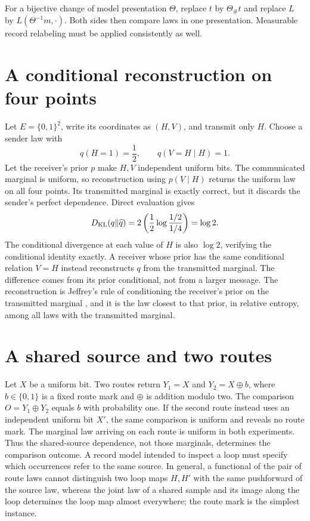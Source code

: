 For a bijective change of model presentation $\Theta$, replace $t$ by $\Theta_\#t$ and replace $L$ by $L(\Theta^{-1}m,\cdot)$. Both sides then compare laws in one presentation. Measurable record relabeling must be applied consistently as well.

\section{A conditional reconstruction on four points}

Let $E=\{0,1\}^2$, write its coordinates as $(H,V)$, and transmit only $H$. Choose a sender law with
\begin{equation}
q(H=1)=\frac12,
\qquad q(V=H\mid H)=1.
\end{equation}
Let the receiver's prior $p$ make $H,V$ independent uniform bits. The communicated marginal is uniform, so reconstruction using $p(V\mid H)$ returns the uniform law on all four points. Its transmitted marginal is exactly correct, but it discards the sender's perfect dependence. Direct evaluation gives
\begin{equation}
D_{\mathrm{KL}}(q\Vert\widehat q)
=2\left(\frac12\log\frac{1/2}{1/4}\right)=\log 2.
\end{equation}
The conditional divergence at each value of $H$ is also $\log2$, verifying the conditional identity exactly. A receiver whose prior has the same conditional relation $V=H$ instead reconstructs $q$ from the transmitted marginal. The difference comes from its prior conditional, not from a larger message. The reconstruction is Jeffrey's rule of conditioning the receiver's prior on the transmitted marginal \citep{DiaconisZabell1982}, and it is the law closest to that prior, in relative entropy, among all laws with the transmitted marginal.

\section{A shared source and two routes}

Let $X$ be a uniform bit. Two routes return $Y_1=X$ and $Y_2=X\oplus b$, where $b\in\{0,1\}$ is a fixed route mark and $\oplus$ is addition modulo two. The comparison $O=Y_1\oplus Y_2$ equals $b$ with probability one. If the second route instead uses an independent uniform bit $X'$, the same comparison is uniform and reveals no route mark. The marginal law arriving on each route is uniform in both experiments. Thus the shared-source dependence, not those marginals, determines the comparison outcome. A record model intended to inspect a loop must specify which occurrences refer to the same source. In general, a functional of the pair of route laws cannot distinguish two loop maps $H,H'$ with the same pushforward of the source law, whereas the joint law of a shared sample and its image along the loop determines the loop map almost everywhere; the route mark is the simplest instance.

